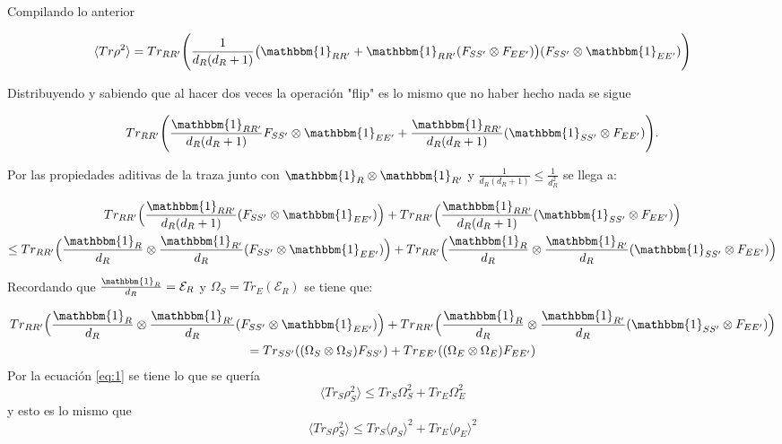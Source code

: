 Compilando lo anterior

\begin{equation}
\langle Tr \rho^2 \rangle = Tr_{RR'} \Bigg( \frac{1}{d_{R}(d_{R}+1)} \big( \mathbbm{1}_{RR'}+\mathbbm{1}_{RR'}(F_{SS'} \otimes F_{EE'}) \big)  (F_{SS'}\otimes \mathbbm{1}_{EE'})   \Bigg)
\end{equation}

Distribuyendo y sabiendo que al hacer dos veces la operación "flip"  es lo mismo que no haber hecho nada se sigue

\begin{equation}
Tr_{RR'} \Bigg( \frac{\mathbbm{1}_{RR'}}{d_{R}(d_{R}+1)} F_{SS'} \otimes \mathbbm{1}_{EE'} + \frac{\mathbbm{1}_{RR'}}{d_{R}(d_{R}+1)} (\mathbbm{1}_{SS'} \otimes F_{EE'})  \Bigg).
\end{equation}

Por las propiedades aditivas de la traza junto con $\mathbbm{1}_{R} \otimes \mathbbm{1}_{R'}$  y $\frac{1}{d_{R}(d_{R}+1)} \le \frac{1}{d_{R}^{2}}$ se llega a:

\begin{multline}

Tr_{RR'} \Big( \frac{\mathbbm{1}_{RR'}}{d_{R}(d_{R}+1)}(F_{SS'} \otimes \mathbbm{1}_{EE'}) \Big) + Tr_{RR'} \Big( \frac{\mathbbm{1}_{RR'}}{d_{R}(d_{R}+1)} (\mathbbm{1}_{SS'} \otimes F_{EE'})  \Big)\\
\le Tr_{RR'}\Big(\frac{\mathbbm{1}_{R}}{d_{R}} \otimes \frac{\mathbbm{1}_{R'}}{d_{R}} (F_{SS'} \otimes \mathbbm{1}_{EE'}) \Big) + Tr_{RR'}\Big(\frac{\mathbbm{1}_{R}}{d_{R}} \otimes \frac{\mathbbm{1}_{R'}}{d_{R}} (\mathbbm{1}_{SS'}\otimes 	F_{EE'}) \Big)
\end{multline}


Recordando que $\frac{\mathbbm{1}_{R}}{d_{R}}= \mathcal{E}_{R}$ y $\Omega_{S}=Tr_{E}(\mathcal{E}_{R})$ se tiene que:

\begin{multline}
Tr_{RR'}\Big(\frac{\mathbbm{1}_{R}}{d_{R}} \otimes \frac{\mathbbm{1}_{R'}}{d_{R}} (F_{SS'} \otimes 		\mathbbm{1}_{EE'}) \Big) + Tr_{RR'}\Big(\frac{\mathbbm{1}_{R}}{d_{R}} \otimes \frac{\mathbbm{1}_{R'}}{d_{R}} (\mathbbm{1}_{SS'}\otimes 	F_{EE'}) \Big) \notag \\
 = Tr_{SS'}((\Omega_{S} \otimes \Omega_{S})F_{SS'}) + Tr_{EE'}((\Omega_{E} \otimes \Omega_{E})F_{EE'})
\end{multline}
Por la ecuación \ref{eq:1} se tiene lo que se quería
\begin{equation}
\langle Tr_{S} \rho_{S}^{2} \rangle \le Tr_{S} \Omega_{S}^{2} +Tr_{E} \Omega_{E}^{2}
\end{equation}
y esto es lo mismo que 
\begin{equation}
\langle Tr_{S} \rho_{S}^{2} \rangle \le Tr_{S} \langle \rho_{S} \rangle ^{2}  + Tr_{E} \langle \rho_{E}\rangle^{2}
\end{equation}

